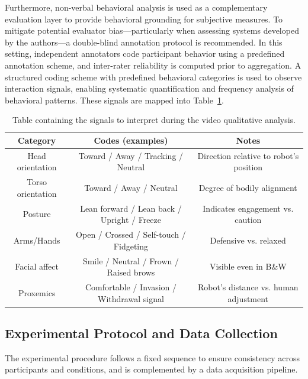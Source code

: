 Furthermore, non-verbal behavioral analysis is used as a complementary evaluation layer to provide behavioral grounding for subjective measures. To mitigate potential evaluator bias—particularly when assessing systems developed by the authors—a double-blind annotation protocol is recommended. In this setting, independent annotators code participant behavior using a predefined annotation scheme, and inter-rater reliability is computed prior to aggregation. A structured coding scheme with predefined behavioral categories is used to observe interaction signals, enabling systematic quantification and frequency analysis of behavioral patterns. These signals are mapped into Table~\ref{tab:signals}.


\begin{table}[]
    \hspace{-0.8in}
    \begin{tabular}{c|c|c}
    \textbf{Category} & \textbf{Codes (examples)} & \textbf{Notes} \\
    \hline
       Head orientation & Toward / Away / Tracking / Neutral & Direction relative to robot’s position \\
       \hline
        Torso orientation & Toward / Away / Neutral & Degree of bodily alignment\\
        \hline
       Posture  & Lean forward / Lean back / Upright / Freeze & Indicates engagement vs. caution \\
       \hline
        Arms/Hands & Open / Crossed / Self-touch / Fidgeting & Defensive vs. relaxed \\
        \hline
       Facial affect  & Smile / Neutral / Frown / Raised brows & Visible even in B\&W \\
       \hline
     Proxemics & Comfortable / Invasion / Withdrawal signal &  Robot’s distance vs. human adjustment\\
    \end{tabular}
    \caption{Table containing the signals to interpret during the video qualitative analysis.}
    \label{tab:signals}
\end{table}

\subsection{Experimental Protocol and Data Collection}

The experimental procedure follows a fixed sequence to ensure consistency across participants and conditions, and is complemented by a data acquisition pipeline.

